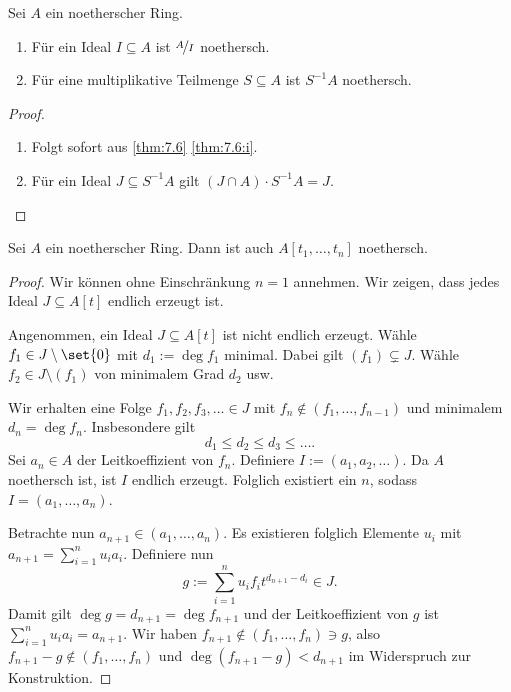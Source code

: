 \documentclass[12pt,a4paper]{scrartcl}
\theoremstyle{cplain}
\theoremstyle{cdef}
\begin{document}
\begin{satz}
	Sei $A$ ein noetherscher Ring.
	\begin{enumerate}
		\item Für ein Ideal $I\subseteq A$ ist $\nicefrac{A}{I}$ noethersch.
		\item Für eine multiplikative Teilmenge $S\subseteq A$ ist $S^{-1}A$ noethersch.
	\end{enumerate}
\end{satz}
\begin{proof}
	\leavevmode
	\begin{enumerate}
		\item Folgt sofort aus \cref{thm:7.6} \ref{thm:7.6:i}.
		\item Für ein Ideal $J\subseteq S^{-1}A$ gilt $(J\cap A) \cdot S^{-1}A = J$.
		\qedhere
	\end{enumerate}
\end{proof}
\begin{satz} \label{thm:hilberts basissatz}
	Sei $A$ ein noetherscher Ring. Dann ist auch $A[t_1,\dots, t_n]$ noethersch.
\end{satz}
\begin{proof}
	Wir können ohne Einschränkung $n = 1$ annehmen. Wir zeigen, dass jedes Ideal $J\subseteq A[t]$ endlich erzeugt ist.
	
	Angenommen, ein Ideal $J\subseteq A[t]$ ist nicht endlich erzeugt. Wähle $f_1\in J\setminus\set{0}$ mit $d_1 := \deg f_1$ minimal. Dabei gilt $(f_1) \subsetneq J$. Wähle $f_2\in J\setminus (f_1)$ von minimalem Grad $d_2$ usw.
	
	Wir erhalten eine Folge $f_1,f_2,f_3,\dots \in J$ mit $f_n\notin (f_1,\dots, f_{n-1})$ und minimalem $d_n = \deg f_n$. Insbesondere gilt
	\[d_1\le d_2\le d_3 \le \dots.\]
	Sei $a_n\in A$ der Leitkoeffizient von $f_n$.
	Definiere $I := (a_1,a_2,\dots)$. Da $A$ noethersch ist, ist $I$ endlich erzeugt. Folglich existiert ein $n$, sodass $I = (a_1,\dots, a_n)$.
	
	Betrachte nun $a_{n+1} \in (a_1,\dots, a_n)$. Es existieren folglich Elemente $u_i$ mit $a_{n+1} = \sum_{i = 1}^n u_ia_i$. Definiere nun
	\[g := \sum_{i = 1}^n u_if_it^{d_{n+1}-d_i} \in J.\]
	Damit gilt $\deg g = d_{n+1} = \deg f_{n+1}$ und der Leitkoeffizient von $g$ ist $\sum_{i = 1}^n u_ia_i = a_{n+1}$.
	Wir haben $f_{n+1}\notin (f_1,\dots, f_n)\ni g$, also $f_{n+1}-g\notin (f_1,\dots, f_n)$ und $\deg(f_{n+1}-g)<d_{n+1}$ im Widerspruch zur Konstruktion.
\end{proof}
\end{document}
